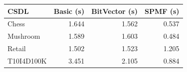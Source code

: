 \begin{tabular}{lrrr}
\toprule
CSDL & Basic (s) & BitVector (s) & SPMF (s) \\
\midrule
Chess & 1.644 & 1.562 & 0.537 \\
Mushroom & 1.589 & 1.603 & 0.484 \\
Retail & 1.502 & 1.523 & 1.205 \\
T10I4D100K & 3.451 & 2.105 & 0.884 \\
\bottomrule
\end{tabular}
